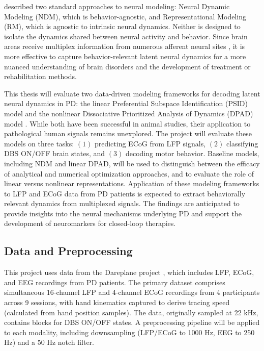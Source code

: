 \documentclass[12pt, a4paper]{article}
\begin{document}
\textcite{saniModelingBehaviorallyRelevant2021} described two standard approaches to neural modeling: Neural Dynamic Modeling (NDM), which is behavior-agnostic, and Representational Modeling (RM), which is agnostic to intrinsic neural dynamics. Neither is designed to isolate the dynamics shared between neural activity and behavior. Since brain areas receive multiplex information from numerous afferent neural sites \parencite{wuMixedSelectivitySubthalamic2025}, it is more effective to capture behavior-relevant latent neural dynamics for a more nuanced understanding of brain disorders and the development of treatment or rehabilitation methods.

This thesis will evaluate two data-driven modeling frameworks for decoding latent neural dynamics in PD: the linear Preferential Subspace Identification (PSID) model \parencite{saniModelingBehaviorallyRelevant2021} and the nonlinear Dissociative Prioritized Analysis of Dynamics (DPAD) model \parencite{saniDissociativePrioritizedModeling2024}. While both have been successful in animal studies, their application to pathological human signals remains unexplored. The project will evaluate these models on three tasks: $(1)$ predicting ECoG from LFP signals, $(2)$ classifying DBS ON/OFF brain states, and $(3)$ decoding motor behavior. Baseline models, including NDM and linear DPAD, will be used to distinguish between the efficacy of analytical and numerical optimization approaches, and to evaluate the role of linear versus nonlinear representations. Application of these modeling frameworks to LFP and ECoG data from PD patients is expected to extract behaviorally relevant dynamics from multiplexed signals. The findings are anticipated to provide insights into the neural mechanisms underlying PD and support the development of neuromarkers for closed-loop therapies.

\subsection{Data and Preprocessing}
This project uses data from the Dareplane project \parencite{doldLFPECoGData2024}, which includes LFP, ECoG, and EEG recordings from PD patients. The primary dataset comprises simultaneous 16-channel LFP and 4-channel ECoG recordings from 4 participants across 9 sessions, with hand kinematics captured to derive tracing speed (calculated from hand position samples). The data, originally sampled at 22 kHz, contains blocks for DBS ON/OFF states. A preprocessing pipeline will be applied to each modality, including downsampling (LFP/ECoG to 1000 Hz, EEG to 250 Hz) and a 50 Hz notch filter.
\end{document}
